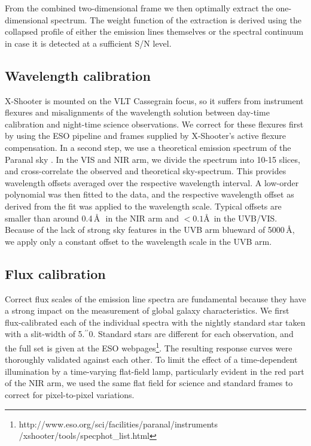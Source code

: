 \documentclass[traditabstract, longauth]{aa}
\newcommand{\farc}{\hbox{$.\!\!^{\prime\prime}$}}
\begin{document}
From the combined two-dimensional frame we then optimally extract the one-dimensional spectrum. The weight function of the extraction is derived using the collapsed profile of either the emission lines themselves or the spectral continuum in case it is detected at a sufficient S/N level.

\subsection{Wavelength calibration}
\label{sec:wavecal}

X-Shooter is mounted on the VLT Cassegrain focus, so it suffers from instrument flexures and misalignments of the wavelength solution between day-time calibration and night-time science observations. We correct for these flexures first by using the ESO pipeline and frames supplied by X-Shooter's active flexure compensation. In a second step, we use a theoretical emission spectrum of the Paranal sky \citep{2012A&A...543A..92N}. In the VIS and NIR arm, we divide the spectrum into 10-15 slices, and cross-correlate the observed and theoretical sky-spectrum. This provides wavelength offsets averaged over the respective wavelength interval. A low-order polynomial was then fitted to the data, and the respective wavelength offset as derived from the fit was applied to the wavelength scale. Typical offsets are smaller than around 0.4\,\AA\,\ in the NIR arm and $<0.1$\AA\, in the UVB/VIS. Because of the lack of strong sky features in the UVB arm blueward of 5000\,\AA, we apply only a constant offset to the wavelength scale in the UVB arm.

\subsection{Flux calibration}
\label{FluxCal}

Correct flux scales of the emission line spectra are fundamental because they have a strong impact on the measurement of global galaxy characteristics. We first flux-calibrated each of the individual spectra with the nightly standard star taken with a slit-width of 5\farc{0}. Standard stars are different for each observation, and the full set is given at the ESO webpages\footnote{http://www.eso.org/sci/facilities/paranal/instruments\\/xshooter/tools/specphot\_list.html}. The resulting response curves were thoroughly validated against each other. To limit the effect of a time-dependent illumination by a time-varying flat-field lamp, particularly evident in the red part of the NIR arm, we used the same flat field for science and standard frames to correct for pixel-to-pixel variations.
\end{document}
